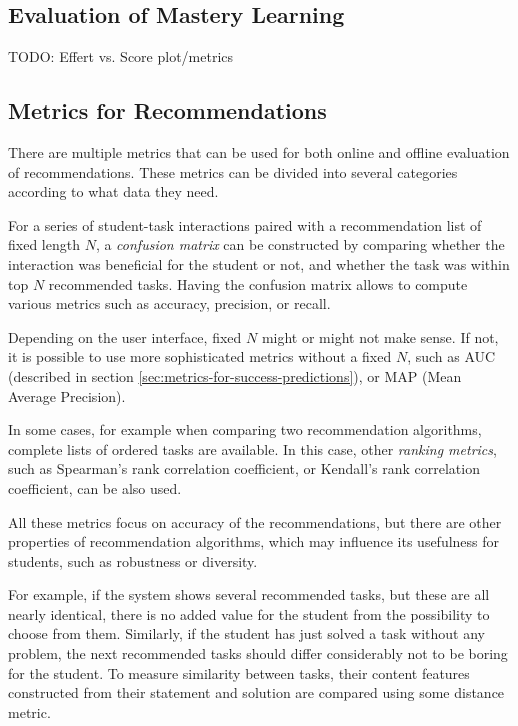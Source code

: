 
\subsection{Evaluation of Mastery Learning}

TODO: Effert vs. Score plot/metrics \cite{learner-models-integration-skills}

\subsection{Metrics for Recommendations}
\label{sec:metrics-for-recommendation}

There are multiple metrics that can be used for both online and offline
evaluation of recommendations.
These metrics can be divided into several categories
according to what data they need.

For a series of student-task interactions paired with a recommendation list of
fixed length $N$, a \emph{confusion matrix} can be constructed by comparing
whether the interaction was beneficial for the student or not,
and whether the task was within top $N$ recommended tasks.
Having the confusion matrix allows to compute various metrics such as
accuracy, precision, or recall. %

Depending on the user interface, fixed $N$ might or might not make sense.
If not, it is possible to use more sophisticated metrics without a fixed $N$,
such as AUC (described in section \ref{sec:metrics-for-success-predictions}),
or MAP (Mean Average Precision).

In some cases, for example when comparing two recommendation algorithms,
complete lists of ordered tasks are available.
In this case, other \emph{ranking metrics},
  such as Spearman's rank correlation coefficient,
  or Kendall's rank correlation coefficient,
  can be also used.

All these metrics focus on accuracy of the recommendations,
but there are other properties of recommendation algorithms,
which may influence its usefulness for students,
such as robustness or diversity.

For example, if the system shows several recommended tasks,
but these are all nearly identical, there is no added value
for the student from the possibility to choose from them.
Similarly, if the student has just solved a task
without any problem, the next recommended tasks should
differ considerably not to be boring for the student.
To measure similarity between tasks, their content features
constructed from their statement and solution are compared
using some distance metric.


